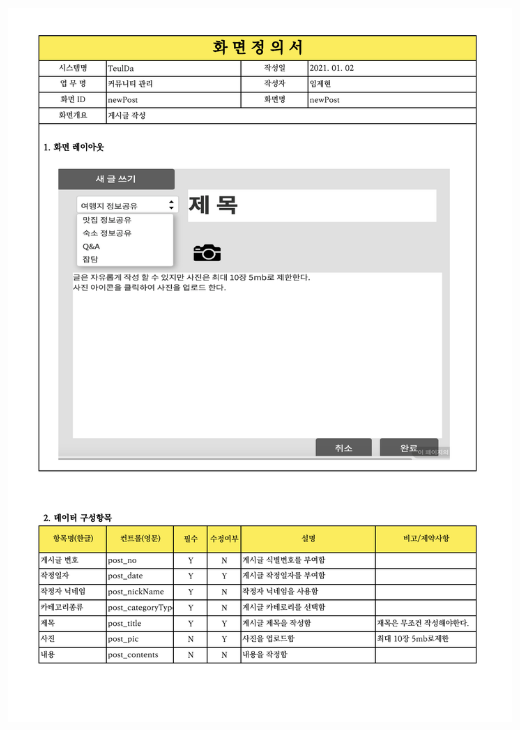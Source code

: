 {{{{{{{{{{{{{{{{{{{{{{{{{{{{{{{{{{{{{{{{{{{{{{{{\includegraphics[width=20cm]{./Figure/Analysis/Display/community/community_07.pdf} \\
}}}}}}}}}}}}}}}}}}}}}}}}}}}}}}}}}}}}}}}}}}}}}}}}
